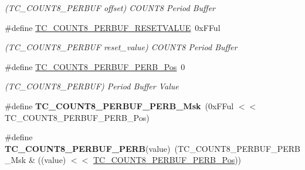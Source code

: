 \begin{DoxyCompactItemize}
\begin{DoxyCompactList}\small\item\em (T\+C\+\_\+\+C\+O\+U\+N\+T8\+\_\+\+P\+E\+R\+B\+U\+F offset) C\+O\+U\+N\+T8 Period Buffer \end{DoxyCompactList}\item 
\hypertarget{group___s_a_m_l21___t_c_ga0e69667161ba8b16adcc7ff41d47a6ba}{}\#define \hyperlink{group___s_a_m_l21___t_c_ga0e69667161ba8b16adcc7ff41d47a6ba}{T\+C\+\_\+\+C\+O\+U\+N\+T8\+\_\+\+P\+E\+R\+B\+U\+F\+\_\+\+R\+E\+S\+E\+T\+V\+A\+L\+U\+E}~0x\+F\+Ful\label{group___s_a_m_l21___t_c_ga0e69667161ba8b16adcc7ff41d47a6ba}

\begin{DoxyCompactList}\small\item\em (T\+C\+\_\+\+C\+O\+U\+N\+T8\+\_\+\+P\+E\+R\+B\+U\+F reset\+\_\+value) C\+O\+U\+N\+T8 Period Buffer \end{DoxyCompactList}\item 
\hypertarget{group___s_a_m_l21___t_c_ga1e3d79d9ace35685fc47850ce0a383f3}{}\#define \hyperlink{group___s_a_m_l21___t_c_ga1e3d79d9ace35685fc47850ce0a383f3}{T\+C\+\_\+\+C\+O\+U\+N\+T8\+\_\+\+P\+E\+R\+B\+U\+F\+\_\+\+P\+E\+R\+B\+\_\+\+Pos}~0\label{group___s_a_m_l21___t_c_ga1e3d79d9ace35685fc47850ce0a383f3}

\begin{DoxyCompactList}\small\item\em (T\+C\+\_\+\+C\+O\+U\+N\+T8\+\_\+\+P\+E\+R\+B\+U\+F) Period Buffer Value \end{DoxyCompactList}\item 
\hypertarget{group___s_a_m_l21___t_c_gac5f5c223cbfaad9d79586f2e1d7d6123}{}\#define {\bfseries T\+C\+\_\+\+C\+O\+U\+N\+T8\+\_\+\+P\+E\+R\+B\+U\+F\+\_\+\+P\+E\+R\+B\+\_\+\+Msk}~(0x\+F\+Ful $<$$<$ T\+C\+\_\+\+C\+O\+U\+N\+T8\+\_\+\+P\+E\+R\+B\+U\+F\+\_\+\+P\+E\+R\+B\+\_\+\+Pos)\label{group___s_a_m_l21___t_c_gac5f5c223cbfaad9d79586f2e1d7d6123}

\item 
\hypertarget{group___s_a_m_l21___t_c_gadc0d8954009f1a130c6d367e23d47dac}{}\#define {\bfseries T\+C\+\_\+\+C\+O\+U\+N\+T8\+\_\+\+P\+E\+R\+B\+U\+F\+\_\+\+P\+E\+R\+B}(value)~(T\+C\+\_\+\+C\+O\+U\+N\+T8\+\_\+\+P\+E\+R\+B\+U\+F\+\_\+\+P\+E\+R\+B\+\_\+\+Msk \& ((value) $<$$<$ \hyperlink{group___s_a_m_l21___t_c_ga1e3d79d9ace35685fc47850ce0a383f3}{T\+C\+\_\+\+C\+O\+U\+N\+T8\+\_\+\+P\+E\+R\+B\+U\+F\+\_\+\+P\+E\+R\+B\+\_\+\+Pos}))\label{group___s_a_m_l21___t_c_gadc0d8954009f1a130c6d367e23d47dac}


\end{DoxyCompactItemize}
